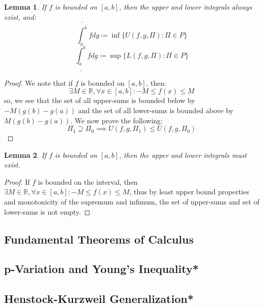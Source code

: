 \documentclass[10pt,letterpaper]{article} %
\newtheorem{lem}{Lemma}[section]
\begin{document}
\begin{lem}
If $f$ is bounded on $[a, b]$, then the upper and lower integrals always exist, and:
\begin{equation*}
\overline{\int_{a}^{b}}fdg \coloneq \inf\{U(f, g, \Pi) : \Pi \in P\}
\end{equation*}
\begin{equation*}
\underline{\int_{a}^{b}}fdg \coloneq \sup\{L(f, g, \Pi) : \Pi \in P\}
\end{equation*}
\end{lem}
\begin{proof}
We note that if $f$ is bounded on $[a, b]$, then:
\begin{equation*}
\exists M \in \mathbb{R}, \forall x \in [a, b]: -M \leqslant f(x) \leqslant M
\end{equation*}
so, we see that the set of all upper-sums is bounded below by $-M(g(b)-g(a))$ and the set of all lower-sums is bounded above by $M(g(b)-g(a))$. We now prove the following:
\begin{equation*}
\Pi_1 \supseteq \Pi_0 \implies U(f, g, \Pi_1) \leqslant U(f, g, \Pi_0)
\end{equation*}

\end{proof}

\begin{lem}
If $f$ is bounded on $[a, b]$, then the upper and lower integrals must exist.
\end{lem}
\begin{proof}
If $f$ is bounded on the interval, then $\exists M \in \mathbb{R}, \forall x \in [a, b]: -M \leqslant f(x) \leqslant M$, thus by least upper bound properties and monotonicity of the supremum and infimum, the set of upper-sums and set of lower-sums is not empty. 
\end{proof}

\subsection{Fundamental Theorems of Calculus}
\subsection{p-Variation and Young's Inequality*}

\subsection{Henstock-Kurzweil Generalization*}
\pagebreak
\end{document}
